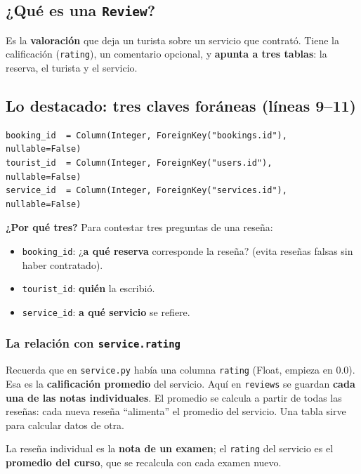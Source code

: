 \documentclass[11pt,a4paper]{article}
\begin{document}
\subsection{¿Qué es una \texttt{Review}?}

Es la \textbf{valoración} que deja un turista sobre un servicio que contrató. Tiene la
calificación (\texttt{rating}), un comentario opcional, y \textbf{apunta a tres tablas}:
la reserva, el turista y el servicio.

\subsection{Lo destacado: \textbf{tres} claves foráneas (líneas 9--11)}

\begin{lstlisting}
booking_id  = Column(Integer, ForeignKey("bookings.id"),  nullable=False)
tourist_id  = Column(Integer, ForeignKey("users.id"),     nullable=False)
service_id  = Column(Integer, ForeignKey("services.id"),  nullable=False)
\end{lstlisting}

\textbf{¿Por qué tres?} Para contestar tres preguntas de una reseña:
\begin{itemize}
    \item \texttt{booking\_id}: ¿\textbf{a qué reserva} corresponde la reseña? (evita reseñas falsas sin haber contratado).
    \item \texttt{tourist\_id}: \textbf{quién} la escribió.
    \item \texttt{service\_id}: \textbf{a qué servicio} se refiere.
\end{itemize}

\subsubsection{La relación con \texttt{service.rating}}

Recuerda que en \texttt{service.py} había una columna \texttt{rating} (Float, empieza en 0.0).
Esa es la \textbf{calificación promedio} del servicio. Aquí en \texttt{reviews} se guardan
\textbf{cada una de las notas individuales}. El promedio se calcula a partir de todas las
reseñas: cada nueva reseña ``alimenta'' el promedio del servicio. Una tabla sirve para calcular
datos de otra.

\begin{analogia}
La reseña individual es la \textbf{nota de un examen}; el \texttt{rating} del servicio es el
\textbf{promedio del curso}, que se recalcula con cada examen nuevo.
\end{analogia}
\end{document}
